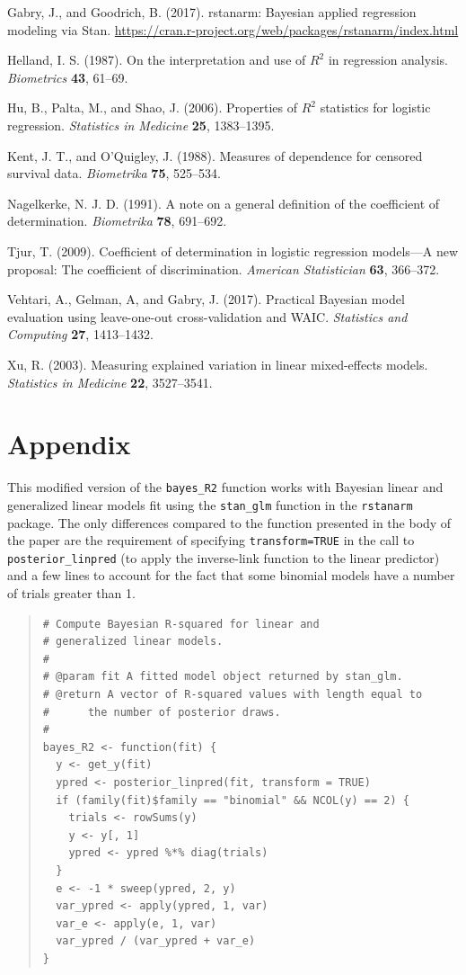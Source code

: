 \documentclass[11pt]{article}
\begin{document}
\bibitem Gabry, J., and Goodrich, B. (2017).  rstanarm:  Bayesian applied regression modeling via Stan.  \url{https://cran.r-project.org/web/packages/rstanarm/index.html}

\bibitem Helland, I. S. (1987).  On the interpretation and use of $R^2$ in regression analysis.  {\em Biometrics} {\bf 43}, 61--69.

\bibitem Hu, B., Palta, M., and Shao, J. (2006).  Properties of $R^2$ statistics for logistic regression.  {\em Statistics in Medicine} {\bf 25}, 1383--1395.

\bibitem Kent, J. T., and O'Quigley, J. (1988). Measures of dependence for censored survival data. {\em Biometrika} {\bf 75}, 525--534.

\bibitem Nagelkerke, N. J. D. (1991).  A note on a general definition of the coefficient of determination. {\em Biometrika} {\bf 78}, 691--692.

\bibitem Tjur, T. (2009).  Coefficient of determination in logistic regression models---A new proposal:  The coefficient of discrimination.  {\em American Statistician} {\bf 63}, 366--372.

\bibitem Vehtari, A., Gelman, A, and Gabry, J. (2017).  Practical Bayesian model evaluation using leave-one-out cross-validation and WAIC. {\em Statistics and Computing} {\bf 27}, 1413--1432.

\bibitem Xu, R. (2003).  Measuring explained variation in linear mixed-effects models.  {\em Statistics in Medicine} {\bf 22}, 3527--3541.


\section*{Appendix}

This modified version of the \verb#bayes_R2# function works with
Bayesian linear and generalized linear models fit using the 
\verb#stan_glm# function in the {\tt rstanarm} package. The only 
differences compared to the function presented in the body of the paper are 
the requirement of specifying \verb#transform=TRUE# in the call to 
\verb#posterior_linpred# (to apply the inverse-link function to the linear 
predictor) and a few lines to account for the fact that some binomial models
have a number of trials greater than 1.

\vspace{-\baselineskip}
\begin{quotation}
\noindent
\begin{small}
\begin{verbatim}
# Compute Bayesian R-squared for linear and
# generalized linear models.
#
# @param fit A fitted model object returned by stan_glm.
# @return A vector of R-squared values with length equal to
#      the number of posterior draws.
#
bayes_R2 <- function(fit) {
  y <- get_y(fit)
  ypred <- posterior_linpred(fit, transform = TRUE)
  if (family(fit)$family == "binomial" && NCOL(y) == 2) {
    trials <- rowSums(y)
    y <- y[, 1]
    ypred <- ypred %*% diag(trials)
  }
  e <- -1 * sweep(ypred, 2, y)
  var_ypred <- apply(ypred, 1, var)
  var_e <- apply(e, 1, var)
  var_ypred / (var_ypred + var_e)
}
\end{verbatim}
\end{small}
\end{quotation}
\end{document}
